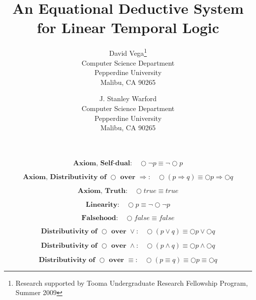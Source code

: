 \documentclass[fleqn, leqno]{article}
\title{An Equational Deductive System\\for Linear Temporal Logic}
\author{David Vega\thanks{Research supported by Tooma Undergraduate Research Fellowship Program, Summer 2009}\\
   Computer Science Department\\
   Pepperdine University\\
   Malibu, CA 90265
   \and
   J. Stanley Warford\\
   Computer Science Department\\
   Pepperdine University\\
   Malibu, CA 90265}
\date{} %
\newcommand{\spacer}{\vspace{-30pt}}
\begin{document}
\maketitle

\begin{equation}\label{E:selfDual}
\textbf{Axiom, Self-dual:}\quad \bigcirc\lnot p \equiv \lnot\bigcirc p
\end{equation}

\spacer

\begin{equation}\label{E:distNextImp}
\textbf{Axiom, Distributivity of $\bigcirc$ over $\Rightarrow$:}\quad \bigcirc (p \Rightarrow q) \equiv \bigcirc p \Rightarrow \bigcirc q
\end{equation}

\spacer

\begin{equation}\label{E:nextTruth}
\textbf{Axiom, Truth:}\quad \bigcirc true \equiv true
\end{equation}

\spacer

\begin{equation}\label{E:linearity}
\textbf{Linearity:}\quad \bigcirc p \equiv \lnot\bigcirc\lnot p
\end{equation}

\spacer

\begin{equation}\label{E:nextFalse}
\textbf{Falsehood:}\quad \bigcirc false \equiv false
\end{equation}

\spacer

\begin{equation}\label{E:distNextOr}
\textbf{Distributivity of $\bigcirc$ over $\lor$:}\quad \bigcirc (p \lor q) \equiv \bigcirc p \lor \bigcirc q
\end{equation}

\spacer

\begin{equation}\label{E:distNextAnd}
\textbf{Distributivity of $\bigcirc$ over $\land$:}\quad \bigcirc (p \land q) \equiv \bigcirc p \land \bigcirc q
\end{equation}

\spacer

\begin{equation}\label{E:distNextEquiv}
\textbf{Distributivity of $\bigcirc$ over $\equiv$:}\quad \bigcirc (p \equiv q) \equiv \bigcirc p \equiv \bigcirc q
\end{equation}
\end{document}
